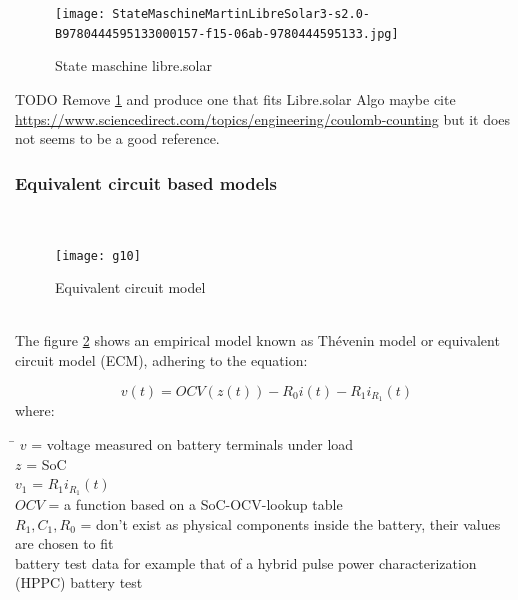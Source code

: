 



\begin{figure}
\centering
\texttt{[image: StateMaschineMartinLibreSolar3-s2.0-B9780444595133000157-f15-06ab-9780444595133.jpg]}
\caption{\label{fig:StateMaschineMartinLibreSolar3} State maschine libre.solar}
\end{figure}
TODO Remove \ref{fig:StateMaschineMartinLibreSolar3}  and produce one that fits Libre.solar Algo maybe cite \url{https://www.sciencedirect.com/topics/engineering/coulomb-counting}  but it does not seems to be a good reference. 



\pagebreak

\subsubsection{Equivalent circuit based models}
\label{section:Equivalentcircuitbasedmodels}
\
\
\
\begin{figure}[h!]
\begin{center}



\texttt{[image: g10]} %
\caption{\label{fig:ECMThevinModel} Equivalent circuit model }
\end{center} 
\end{figure} 
 \\
The figure \ref{fig:ECMThevinModel} shows an empirical model known as Thévenin model or equivalent circuit model (ECM), adhering to the equation: 

\begin{equation}
{v}(t) = {OCV}(z(t))  - {R}_{0} i(t) - {R}_{1} {i}_{R_1}(t) 
\label{equation:ECM}
\end{equation}
where: 
\begin{tabbing}
\phantom{$v(t)  \  \ \ \ \ \ \ \ \ \ \ \ $}\= \kill
$v$\> =  voltage measured on battery terminals under load   \\
$z  $\> =  SoC  \\
$v_	1$\> =  ${R}_{1} {i}_{R_1}(t)$ \\
$OCV $\>  = a function based on a SoC-OCV-lookup table \\
$R_1,C_1,R_0$\> = don't exist as physical components inside the battery, their values are chosen to fit  \\
battery test data for example that of a hybrid pulse power characterization (HPPC) battery test  \\ %

\end{tabbing}

